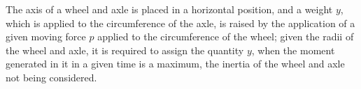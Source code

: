 The axis of a wheel and axle is placed in a horizontal 
position, and a weight $y$, which is applied to the 
circumference of the axle, is raised by the application
of a given moving force $p$ applied to the circumference
of the wheel; given the radii of the wheel and axle, it
is required to assign the quantity $y$, when the moment 
generated in it in a given time is a maximum, the inertia
of the wheel and axle not being considered.
